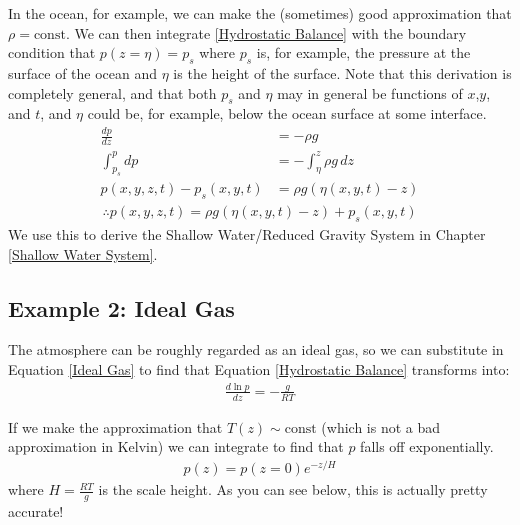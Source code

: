 In the ocean, for example, we can make the (sometimes) good approximation that $\rho=\text{const}$. We can then integrate \ref{Hydrostatic Balance} with the boundary condition that $p(z=\eta)=p_s$ where $p_s$ is, for example, the pressure at the surface of the ocean and $\eta$ is the height of the surface. Note that this derivation is completely general, and that both $p_s$ and $\eta$ may in general be functions of $x$,$y$, and $t$, and $\eta$ could be, for example, below the ocean surface at some interface.
\begin{align*}
    \frac{d p}{d z}&=-\rho g\\
    \int_{p_s}^{p}dp&=-\int_{\eta}^{z}\rho g \, dz\\
    p(x,y,z,t)-p_s(x,y,t)&=\rho g (\eta(x,y,t)-z)
\end{align*}
\begin{align}
    \therefore \boxed{p(x,y,z,t)=\rho g(\eta(x,y,t)-z)+p_s(x,y,t)}
\end{align}
We use this to derive the Shallow Water/Reduced Gravity System in Chapter \ref{Shallow Water System}.

\subsection{Example 2: Ideal Gas}\label{Example 2: Ideal Gas}

The atmosphere can be roughly regarded as an ideal gas, so we can substitute in Equation \ref{Ideal Gas} to find that Equation \ref{Hydrostatic Balance} transforms into:
\begin{align}
    \label{Hydrostatic Balance Ideal}
    \boxed{\frac{d\ln p}{dz}=-\frac{g}{RT}}
\end{align}

If we make the approximation that $T(z)\sim\text{const}$ (which is not a bad approximation in Kelvin) we can integrate to find that $p$ falls off exponentially.
\begin{align*}
    p(z)=p(z=0)e^{-z/H}
\end{align*}
where $H=\frac{RT}{g}$ is the scale height. As you can see below, this is actually pretty accurate!

